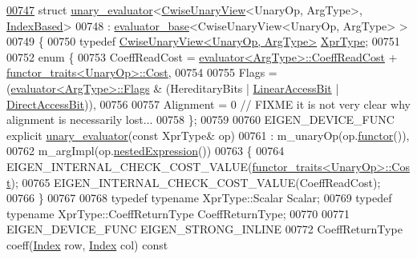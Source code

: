 \begin{DoxyCode}
\hyperlink{struct_eigen_1_1internal_1_1unary__evaluator_3_01_cwise_unary_view_3_01_unary_op_00_01_arg_type_01_4_00_01_index_based_01_4}{00747} \textcolor{keyword}{struct }\hyperlink{struct_eigen_1_1internal_1_1unary__evaluator}{unary\_evaluator}<\hyperlink{group___core___module_class_eigen_1_1_cwise_unary_view}{CwiseUnaryView}<UnaryOp, ArgType>, 
      \hyperlink{struct_eigen_1_1internal_1_1_index_based}{IndexBased}>
00748   : \hyperlink{struct_eigen_1_1internal_1_1evaluator__base}{evaluator\_base}<CwiseUnaryView<UnaryOp, ArgType> >
00749 \{
00750   \textcolor{keyword}{typedef} \hyperlink{group___core___module_class_eigen_1_1_cwise_unary_view}{CwiseUnaryView<UnaryOp, ArgType>} 
      \hyperlink{group___core___module_class_eigen_1_1_cwise_unary_view}{XprType};
00751   
00752   \textcolor{keyword}{enum} \{
00753     CoeffReadCost = \hyperlink{struct_eigen_1_1internal_1_1evaluator}{evaluator<ArgType>::CoeffReadCost} + 
      \hyperlink{struct_eigen_1_1internal_1_1functor__traits}{functor\_traits<UnaryOp>::Cost},
00754     
00755     Flags = (\hyperlink{struct_eigen_1_1internal_1_1evaluator}{evaluator<ArgType>::Flags} & (HereditaryBits | 
      \hyperlink{group__flags_ga4b983a15d57cd55806df618ac544d09e}{LinearAccessBit} | \hyperlink{group__flags_gabf1e9d0516a933445a4c307ad8f14915}{DirectAccessBit})),
00756     
00757     Alignment = 0 \textcolor{comment}{// FIXME it is not very clear why alignment is necessarily lost...}
00758   \};
00759 
00760   EIGEN\_DEVICE\_FUNC \textcolor{keyword}{explicit} \hyperlink{struct_eigen_1_1internal_1_1unary__evaluator}{unary\_evaluator}(\textcolor{keyword}{const} XprType& op)
00761     : m\_unaryOp(op.\hyperlink{group___core___module_af01271cdadcbcf195b5d3130ff2e1a48}{functor}()), 
00762       m\_argImpl(op.\hyperlink{group___core___module_a21d59e387e600b1d650cb002175760b4}{nestedExpression}()) 
00763   \{
00764     EIGEN\_INTERNAL\_CHECK\_COST\_VALUE(\hyperlink{struct_eigen_1_1internal_1_1functor__traits}{functor\_traits<UnaryOp>::Cost});
00765     EIGEN\_INTERNAL\_CHECK\_COST\_VALUE(CoeffReadCost);
00766   \}
00767 
00768   \textcolor{keyword}{typedef} \textcolor{keyword}{typename} XprType::Scalar Scalar;
00769   \textcolor{keyword}{typedef} \textcolor{keyword}{typename} XprType::CoeffReturnType CoeffReturnType;
00770 
00771   EIGEN\_DEVICE\_FUNC EIGEN\_STRONG\_INLINE
00772   CoeffReturnType coeff(\hyperlink{namespace_eigen_a62e77e0933482dafde8fe197d9a2cfde}{Index} row, \hyperlink{namespace_eigen_a62e77e0933482dafde8fe197d9a2cfde}{Index} col)\textcolor{keyword}{ const}

\end{DoxyCode}
